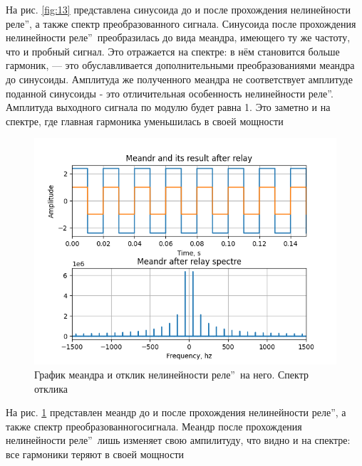 На рис. \ref{fig:13} представлена синусоида до и после прохождения
нелинейности  реле\textquotedblright, 
а также спектр преобразованного сигнала. Синусоида после прохождения
нелинейности  реле\textquotedblright\
преобразилась до вида меандра, имеющего ту же частоту, что и пробный
сигнал. Это отражается на спектре: в нём становится больше гармоник,
— это обуславливается дополнительными преобразованиями меандра до
синусоиды. Амплитуда же полученного меандра не соответствует
амплитуде поданной синусоиды - это отличительная особенность 
нелинейности  реле\textquotedblright.
Амплитуда выходного сигнала по модулю будет равна 1. Это заметно
и на спектре, где главная гармоника уменьшилась в своей мощности 

\begin{figure}[H]
	\centering
	\includegraphics[width=0.75\linewidth]{body/images/meandr-after-relay-and-its-spectre.png}
	\caption{График меандра и отклик нелинейности 
	 реле\textquotedblright\ на него. Спектр отклика}
	\label{fig:14}
\end{figure}

На рис. \ref{fig:14} представлен меандр до и после прохождения
нелинейности  реле\textquotedblright,
а также спектр преобразованногосигнала. Меандр после прохождения
нелинейности  реле\textquotedblright\ 
лишь изменяет свою ампилитуду, что видно и на спектре: все
гармоники теряют в своей мощности

